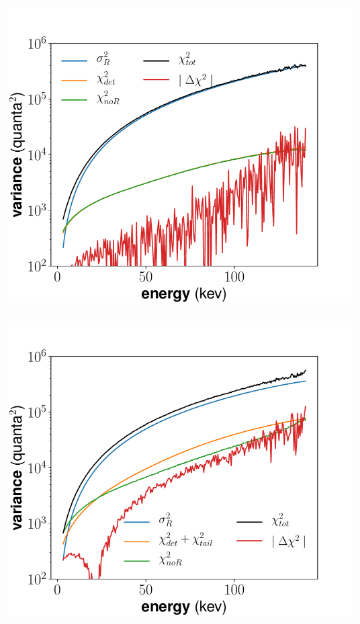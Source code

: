 {\begin{figure}[p]
\begin{subfigure}{0.5\textwidth}
  \caption{}
\end{subfigure}
\begin{subfigure}{0.5\textwidth}
  \centering
  \includegraphics[width=\textwidth]{Figures/toysigR_notail.pdf}
  \caption{}
\end{subfigure}%
\begin{subfigure}{0.5\textwidth}
  \centering
  \includegraphics[width=\textwidth]{Figures/toysigR_wtail.pdf}
  \caption{}
\end{subfigure}

\end{figure}}
